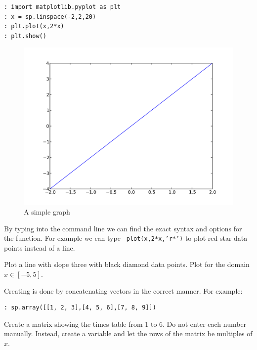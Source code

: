 \begin{lstlisting}
: import matplotlib.pyplot as plt
: x = sp.linspace(-2,2,20)
: plt.plot(x,2*x)
: plt.show()    
\end{lstlisting}

\begin{figure}
\begin{center}
        \includegraphics[scale=0.5]{./Figures/graph.pdf}
        \caption{A simple graph}
\end{center}
\end{figure}

By typing  into the command line we can find the exact syntax and
options for the  function. For example we can type {\tt
plot(x,2*x,'r*')} to plot red star data points instead of a line.

\begin{problem}
Plot a line with slope three with black diamond data points. Plot for the domain
$x \in [-5,5]$. 
\end{problem}

Creating is done by concatenating vectors in the correct manner. For example:

\begin{lstlisting}
: sp.array([[1, 2, 3],[4, 5, 6],[7, 8, 9]])
\end{lstlisting}

\begin{problem}
Create a matrix showing the times table from 1 to 6. Do not enter each number
manually. Instead, create a variable  and let the rows
of the matrix be multiples of $x$.
\end{problem}

